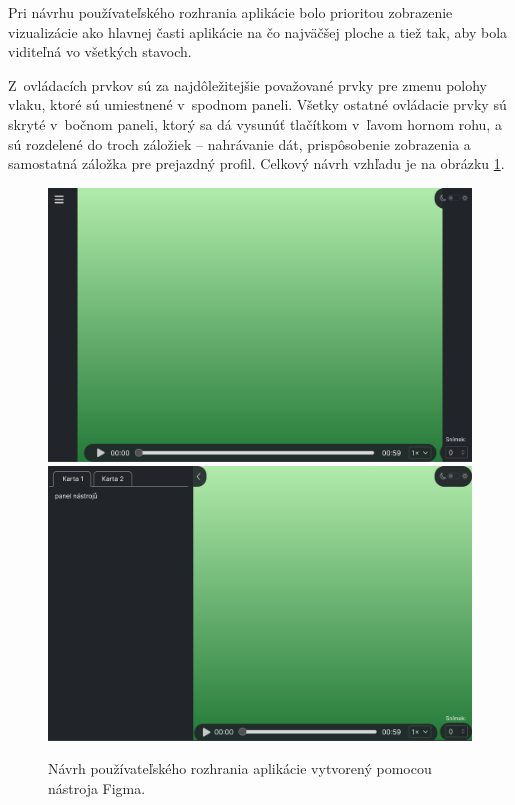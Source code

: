 Pri návrhu používateľského rozhrania aplikácie bolo prioritou zobrazenie vizualizácie ako hlavnej časti aplikácie na čo najväčšej ploche a tiež tak, aby bola viditeľná vo všetkých stavoch.

Z~ovládacích prvkov sú za najdôležitejšie považované prvky pre zmenu polohy vlaku, ktoré sú umiestnené v~spodnom paneli. Všetky ostatné ovládacie prvky sú skryté v~bočnom paneli, ktorý sa dá vysunúť tlačítkom v~ľavom hornom rohu, a sú rozdelené do troch záložiek -- nahrávanie dát, prispôsobenie zobrazenia a samostatná záložka pre prejazdný profil. Celkový návrh vzhľadu je na obrázku \ref{fig:navrh_gui}.

\begin{figure}[h]
    \centering
    \includegraphics[width=0.9\linewidth]{text_prace/obrazky-figures/navrh1.pdf}
    \includegraphics[width=0.9\linewidth]{text_prace/obrazky-figures/navrh2.pdf}
    \caption[Návrh používateľského rozhrania aplikácie.]{Návrh používateľského rozhrania aplikácie vytvorený pomocou nástroja Figma.}
    \label{fig:navrh_gui}
\end{figure}

